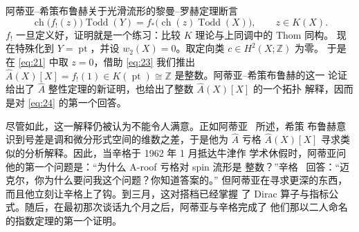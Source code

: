 \documentclass[11pt]{amsart}
\theoremstyle{definition}
\theoremstyle{remark}
\theoremstyle{plain}
\numberwithin{equation}{section}
\renewcommand{\:}{\colon}
\newcommand{\Ahat}{{\hat A}}
\DeclareMathOperator{\pt}{pt}
\newcommand{\QQ}{{\mathbb Q}}
\newcommand{\ZZ}{{\mathbb Z}}
\DeclareMathOperator{\ch}{ch}
\DeclareMathOperator{\ind}{ind}
\DeclareMathOperator{\Sign}{Sign}
\DeclareMathOperator{\Todd}{Todd}
\begin{document}
阿蒂亚–希策布鲁赫关于光滑流形的黎曼–罗赫定理断言
  \begin{equation}\label{eq:21}
     \ch\bigl(f_!(z)\bigr) \Todd(Y) = f_*\bigl( \ch(z)\Todd(X)\bigr), \qquad
     z\in K(X).
  \end{equation}
$f_!$ 一旦定义好，证明就是一个练习：比较 $K$ 理论与上同调中的 Thom 同构。
现在特殊化到 $Y=\pt$，并设 $w_2(X)=0$。取定向类 $c\in H^2(X;\ZZ)$ 为零。
于是在 \eqref{eq:21} 中取 $z=0$，借助 \eqref{eq:23} 我们推出
$\Ahat(X)[X] = f_!(1)\in K(\pt)\cong \ZZ$ 是整数。阿蒂亚–希策布鲁赫的这一
论证给出了 $\Ahat$ 整性定理的新证明，也给出了整数 $\Ahat(X)[X]$ 的一个拓扑
解释，因而是对 \eqref{eq:24} 的第一个回答。



尽管如此，这一解释仍被认为不能令人满意。正如阿蒂亚~\cite{A1} 所述，希策
布鲁赫意识到号差是调和微分形式空间的维数之差，于是他为 $\Ahat$ 亏格
$\Ahat(X)[X]$ 寻求类似的分析解释。因此，当辛格于 1962 年 1 月抵达牛津作
学术休假时，阿蒂亚问他的第一个问题是：“为什么 A-roof 亏格对 spin 流形是
整数？”辛格~\cite{S1} 回答：“迈克尔，你为什么要问我这个问题？你知道答案的。”
但阿蒂亚在寻求更深的东西，而且他立刻让辛格上了钩。到三月，这对搭档已经掌握
了 Dirac 算子与指标公式。随后，在最初那次谈话九个月之后，阿蒂亚与辛格完成了
他们那以二人命名的指数定理的第一个证明。


\end{document}
